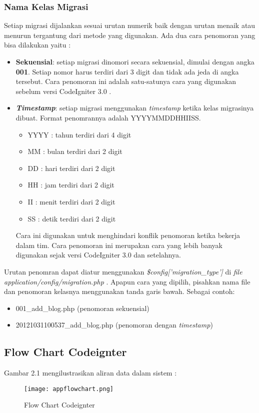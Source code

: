 \subsubsection{Nama Kelas Migrasi}
Setiap migrasi dijalankan sesuai urutan numerik baik dengan urutan menaik atau menurun tergantung dari metode yang digunakan. Ada dua cara penomoran yang bisa dilakukan yaitu :
\begin{itemize}
	\item \textbf{Sekuensial}: setiap migrasi dinomori secara sekuensial, dimulai dengan angka \textbf{001}. Setiap nomor harus terdiri dari 3 digit dan tidak ada jeda di angka tersebut. Cara penomoran ini adalah satu-satunya cara yang digunakan sebelum versi CodeIgniter 3.0 . \cite{CodeIgniter:17}
	\item \textbf{\textit{Timestamp}}: setiap migrasi menggunakan \textit{timestamp} ketika kelas migrasinya dibuat. Format penomrannya adalah YYYYMMDDHHIISS.
		\begin{itemize}
		\item YYYY	: tahun terdiri dari 4 digit
		\item MM	: bulan terdiri dari 2 digit
		\item DD	: hari terdiri dari 2 digit
		\item HH	: jam terdiri dari 2 digit
		\item II	: menit terdiri dari 2 digit
		\item SS	: detik terdiri dari 2 digit
		\end{itemize}
Cara ini digunakan untuk menghindari konflik penomoran ketika bekerja dalam tim. Cara penomoran ini merupakan cara yang lebih banyak digunakan sejak versi CodeIgniter 3.0 dan setelahnya. \cite{CodeIgniter:17}
\end{itemize}
Urutan penomran dapat diatur menggunakan \textit{\$config['migration\_type']} di \textit{file} \textit{application/config/migration.php} . Apapun cara yang dipilih, pisahkan nama file dan penomoran kelasnya menggunakan tanda garis bawah. Sebagai contoh: \cite{CodeIgniter:17}
\begin{itemize}
	\item 001\_add\_blog.php (penomoran sekuensial)
	\item 20121031100537\_add\_blog.php (penomoran dengan \textit{timestamp})
\end{itemize}

\subsection{Flow Chart Codeignter}
Gambar 2.1 mengilustrasikan aliran data dalam sistem : 
\begin{figure} [H]
	\centering  
	\texttt{[image: appflowchart.png]}  
	\caption[Flow Chart Codeignter]{Flow Chart Codeignter} 
	\label{fig:flow-chart-CodeIgniter} 
\end{figure}

